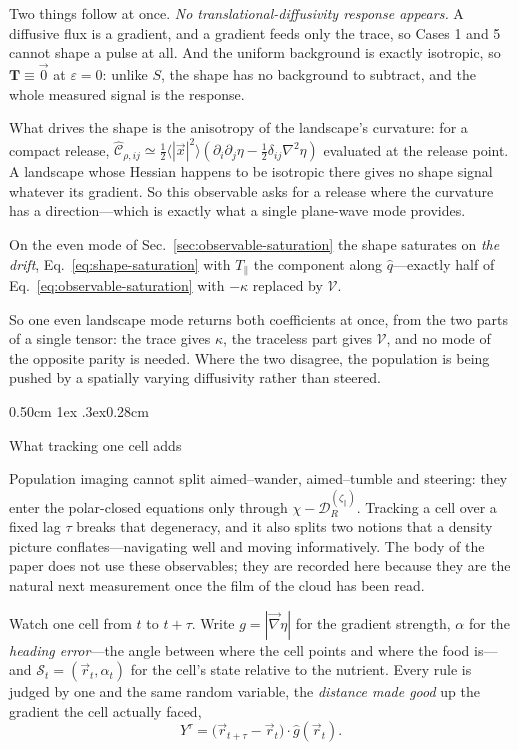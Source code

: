 \documentclass[
  reprint,
  superscriptaddress,
  amsmath,
  amssymb,
  aps,
  pre,
  nofootinbib,
  floatfix
]{revtex4-2}
\makeatletter
\newcommand{\rv}{\vec r}
\newcommand{\grad}{\vec{\nabla}}
\newcommand{\lap}{\nabla^2}
\newcommand{\zp}{\zeta_\parallel}
\newcommand{\Tsh}{\mathbf T}
\def\section{\@startsection{section}{1}{\z@}%
  {0.50cm \@plus1ex \@minus.3ex}{0.28cm}%
  {\normalfont\small\bfseries\raggedright}}%
\makeatother
\begin{document}
Two things follow at once.  \emph{No translational-diffusivity response
appears.}  A diffusive flux is a gradient, and a gradient feeds only the
trace, so Cases 1 and 5 cannot shape a pulse at all.  And the uniform
background is exactly isotropic, so $\Tsh\equiv\vec0$ at $\varepsilon=0$:
unlike $S$, the shape has no background to subtract, and the whole measured
signal is the response.

What drives the shape is the anisotropy of the landscape's curvature: for a
compact release,
$\hat{\mathcal C}_{\rho,ij}\simeq\tfrac12\langle|\vec x|^2\rangle
(\partial_i\partial_j\eta-\tfrac12\delta_{ij}\lap\eta)$
evaluated at the release point.  A landscape whose Hessian happens to be
isotropic there gives no shape signal whatever its gradient.  So this
observable asks for a release where the curvature has a direction---which is
exactly what a single plane-wave mode provides.

On the even mode of Sec.~\ref{sec:observable-saturation} the shape saturates on
\emph{the drift},
Eq.~\eqref{eq:shape-saturation}
with $T_\parallel$ the component along $\hat q$---exactly half of
Eq.~\eqref{eq:observable-saturation} with $-\kappa$ replaced by $\mathcal V$.

So one even landscape mode returns both coefficients at once, from the two
parts of a single tensor: the trace gives $\kappa$, the traceless part gives
$\mathcal V$, and no mode of the opposite parity is needed.  Where the two
disagree, the population is being pushed by a spatially varying diffusivity
rather than steered.

\section{What tracking one cell adds}
\label{sec:information}

Population imaging cannot split aimed--wander, aimed--tumble and steering:
they enter the polar-closed equations only through
$\chi-\mathcal D_R^{(\zp)}$.  Tracking a cell over a fixed lag $\tau$ breaks
that degeneracy, and it also splits two notions that a density picture
conflates---navigating well and moving informatively.  The body of the paper
does not use these observables; they are recorded here because they are the
natural next measurement once the film of the cloud has been read.

Watch one cell from $t$ to $t+\tau$.  Write $g=|\grad\eta|$ for the gradient
strength, $\alpha$ for the \emph{heading error}---the angle between where the
cell points and where the food is---and $\mathcal S_t=(\rv_t,\alpha_t)$ for
the cell's state relative to the nutrient.  Every rule is judged by one and
the same random variable, the \emph{distance made good} up the gradient the
cell actually faced,
\begin{equation}
 Y^{\tau}=\bigl(\rv_{t+\tau}-\rv_t\bigr)\cdot\hat g(\rv_t).
 \label{eq:projected-displacement}
\end{equation}
\end{document}
